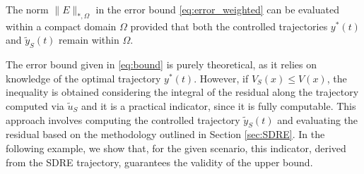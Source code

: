 \documentclass{article}
\begin{document}
The norm $\|E\|_{*,\Omega}$ in the error bound \eqref{eq:error_weighted} can be evaluated within a compact domain $\Omega$ provided that both the controlled trajectories $y^*(t)$ and $\tilde{y}_S(t)$ remain within $\Omega$.

The error bound given in \eqref{eq:bound} is purely theoretical, as it relies on knowledge of the optimal trajectory $y^*(t)$. However, if $V_S(x) \le V(x)$, the inequality is obtained considering the integral of the residual along the trajectory computed via $\tilde{u}_{S}$ and it is a practical indicator, since it is fully computable. This approach involves computing the controlled trajectory $\tilde{y}_{S}(t)$ and evaluating the residual based on the methodology outlined in Section \ref{sec:SDRE}.  In the following example, we show that, for the given scenario, this indicator, derived from the SDRE trajectory, guarantees the validity of the upper bound.

\end{document}
